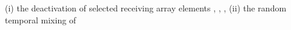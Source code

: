 (i) the deactivation of
selected receiving array elements
\cite[Sect. III-C.1)]{article:BessonITUFFC2018},
\cite[Sects. 3.2 and 4]{proc:BessonICIP2016},
\cite[Sect. V-B]{article:DavidJASA2015},
(ii) the random temporal mixing of

